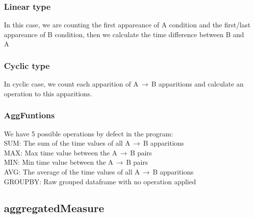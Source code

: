\documentclass[11pt]{article} %
\begin{document}
\subsubsection{Linear type}
In this case, we are counting the first appareance of A condition and the first/last appareance of B condition, then we calculate the time difference between B and A\\
\subsubsection{Cyclic type}
In cyclic case, we count each apparition of A$\,\to\,$B apparitions and calculate an operation to this apparitions.
\subsubsection{AggFuntions}
We have 5 possible operations by defect in the program:\\

SUM: The sum of the time values of all A$\,\to\,$B apparitions\\
\indent
MAX: Max time value between the A$\,\to\,$B pairs\\
\indent
MIN: Min time value between the A$\,\to\,$B pairs\\
\indent
AVG: The average of the time values of all A$\,\to\,$B apparitions\\
\indent
GROUPBY: Raw grouped dataframe with no operation applied\\

\subsection{aggregatedMeasure}
\end{document}
